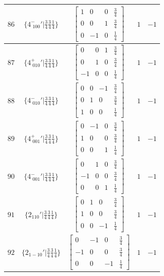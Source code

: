 \documentclass[fleqn,8pt]{jsarticle}
\begin{document}
\begin{longtable}{ccccc}
$ 86 $ & $ \{4^{-}_{\,\,100}{}'|\frac{3}{4} \frac{3}{4} \frac{1}{4}\} $ & $ \begin{bmatrix} 1 & 0 & 0 & \frac{3}{4} \\ 0 & 0 & 1 & \frac{3}{4} \\ 0 & -1 & 0 & \frac{1}{4} \end{bmatrix} $ & $ 1 $ & $ -1 $ \\ \hline
$ 87 $ & $ \{4^{+}_{\,\,010}{}'|\frac{3}{4} \frac{3}{4} \frac{1}{4}\} $ & $ \begin{bmatrix} 0 & 0 & 1 & \frac{3}{4} \\ 0 & 1 & 0 & \frac{3}{4} \\ -1 & 0 & 0 & \frac{1}{4} \end{bmatrix} $ & $ 1 $ & $ -1 $ \\ \hline
$ 88 $ & $ \{4^{-}_{\,\,010}{}'|\frac{3}{4} \frac{3}{4} \frac{1}{4}\} $ & $ \begin{bmatrix} 0 & 0 & -1 & \frac{3}{4} \\ 0 & 1 & 0 & \frac{3}{4} \\ 1 & 0 & 0 & \frac{1}{4} \end{bmatrix} $ & $ 1 $ & $ -1 $ \\ \hline
$ 89 $ & $ \{4^{+}_{\,\,001}{}'|\frac{3}{4} \frac{3}{4} \frac{1}{4}\} $ & $ \begin{bmatrix} 0 & -1 & 0 & \frac{3}{4} \\ 1 & 0 & 0 & \frac{3}{4} \\ 0 & 0 & 1 & \frac{1}{4} \end{bmatrix} $ & $ 1 $ & $ -1 $ \\ \hline
$ 90 $ & $ \{4^{-}_{\,\,001}{}'|\frac{3}{4} \frac{3}{4} \frac{1}{4}\} $ & $ \begin{bmatrix} 0 & 1 & 0 & \frac{3}{4} \\ -1 & 0 & 0 & \frac{3}{4} \\ 0 & 0 & 1 & \frac{1}{4} \end{bmatrix} $ & $ 1 $ & $ -1 $ \\ \hline
$ 91 $ & $ \{2{}_{110}{}'|\frac{3}{4} \frac{3}{4} \frac{1}{4}\} $ & $ \begin{bmatrix} 0 & 1 & 0 & \frac{3}{4} \\ 1 & 0 & 0 & \frac{3}{4} \\ 0 & 0 & -1 & \frac{1}{4} \end{bmatrix} $ & $ 1 $ & $ -1 $ \\ \hline
$ 92 $ & $ \{2{}_{1-10}{}'|\frac{3}{4} \frac{3}{4} \frac{1}{4}\} $ & $ \begin{bmatrix} 0 & -1 & 0 & \frac{3}{4} \\ -1 & 0 & 0 & \frac{3}{4} \\ 0 & 0 & -1 & \frac{1}{4} \end{bmatrix} $ & $ 1 $ & $ -1 $ \\ \hline

\end{longtable}
\end{document}
